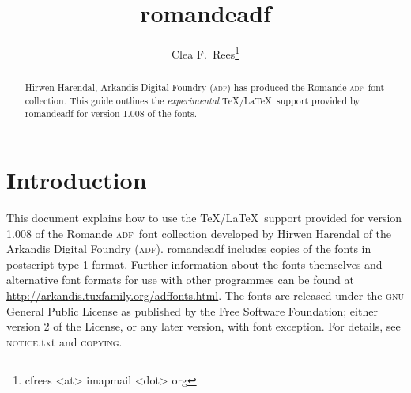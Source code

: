 \documentclass[11pt,british]{article}
\title{romandeadf}
\author{Clea F.\ Rees\footnote{cfrees <at> imapmail <dot> org}}
\date{\dyddiad}
\begin{document}
\maketitle\thispagestyle{empty}
\setlength{\parindent}{0pt}
\setlength{\parskip}{0.5em}
	
	
\newcommand*{\adf}{\textsc{adf}}
\newcommand*{\lpack}[1]{\textsf{#1}}
\newcommand*{\fgroup}[1]{\textsf{#1}}
\newcommand*{\fname}[1]{\textsf{#1}}

\begin{abstract}
	\hspace*{-\parindent}Hirwen Harendal, Arkandis Digital Foundry (\adf) has produced the Romande \adf\ font collection. This guide outlines the \emph{experimental} \TeX/\LaTeX\ support provided by \lpack{romandeadf} for version 1.008 of the fonts.
\end{abstract}

\tableofcontents

\section{Introduction}

This document explains how to use the \TeX/\LaTeX\ support provided for version 1.008 of the Romande \adf\ font collection developed by Hirwen Harendal of the Arkandis Digital Foundry (\adf). \lpack{romandeadf} includes copies of the fonts in postscript type 1 format. Further  information about the fonts themselves and alternative font formats for use with other programmes can be found at \url{http://arkandis.tuxfamily.org/adffonts.html}. The fonts are released under the \textsc{gnu} General Public License as published by the Free Software Foundation; either version 2 of the License, or any later version, with font exception. For details, see \textsc{notice}.txt and \textsc{copying}.
\end{document}
